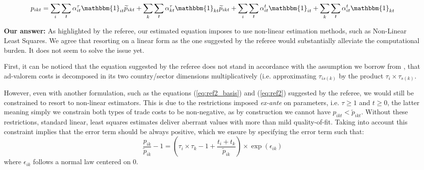 \documentclass[a4paper,11pt]{article}
\begin{document}
\begin{equation}
p_{ikt}= \sum_i \sum_t \alpha_{it}^\tau \mathbbm{1}_{it}\widetilde{p}_{ikt} +  \sum_k \sum_t \alpha_{kt}^\tau \mathbbm{1}_{kt}\widetilde{p}_{ikt} + \sum_i \sum_t \alpha_{it}^t \mathbbm{1}_{it} + \sum_k \sum_t \alpha_{it}^t\mathbbm{1}_{kt} \label{eq:ref2}
\end{equation}


\textbf{Our answer:} As highlighted by the referee, our estimated equation imposes to use non-linear estimation methods, such as Non-Linear Least Squares. We agree that resorting on a linear form as the one suggested by the referee would substantially alleviate the computational burden. It does not seem to solve the issue yet.

First, it can be noticed that the equation suggested by the referee does not stand in accordance with the assumption we borrow from \cite{Irrazabal_2015}, that ad-valorem costs is decomposed in its two country/sector dimensions multiplicatively (i.e. approximating $\tau_{is(k)}$ by the product $\tau_i\times \tau_{s(k)}$.

However, even with another formulation, such as the equations (\ref{eq:ref2_basis}) and (\ref{eq:ref2}) suggested by the referee, we would still be constrained to resort to non-linear estimators. This is due to the restrictions imposed \textit{ex-ante} on parameters, i.e. $\tau \geq 1$ and $t\geq 0$, the latter meaning simply we constrain both types of trade costs to be non-negative, as by construction we cannot have $p_{ikt} < \widetilde{p}_{ikt}$. Without these restrictions, standard linear, least squares estimates deliver aberrant values with more than mild quality-of-fit. Taking into account this constraint implies that the error term should be always positive, which we ensure by specifying the error term such that:
\begin{equation*}
\frac{p_{ik}}{\widetilde{p}_{ik}}-1 =\left(\tau_{i}\times \tau_{k} -1+\frac{t_{i} + t_{k}}{\widetilde{p}_{ik}} \right)\times \exp(\epsilon_{ik})
\end{equation*}
\noindent where $\epsilon_{ik}$ follows a normal law centered on 0.

\newpage


\end{document}
